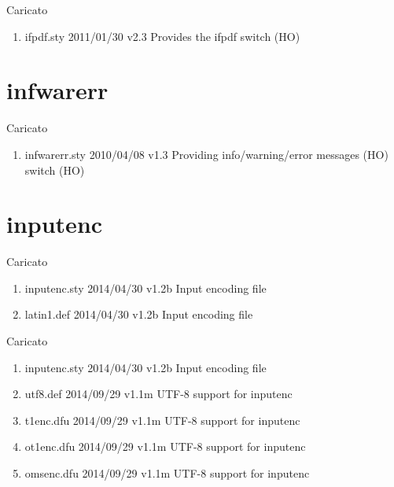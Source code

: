 Caricato 
\begin{enumerate}
\item ifpdf.sty 2011/01/30 v2.3 Provides the ifpdf switch (HO)
\end{enumerate} 
\section{infwarerr}  

Caricato 
\begin{enumerate}
\item infwarerr.sty 2010/04/08 v1.3 Providing info/warning/error messages (HO) switch (HO)
\end{enumerate} 
\section{inputenc}  

Caricato 
\begin{enumerate}
\item inputenc.sty 2014/04/30 v1.2b Input encoding file
\item latin1.def 2014/04/30 v1.2b Input encoding file 
\end{enumerate} 

Caricato 
\begin{enumerate}
\item inputenc.sty 2014/04/30 v1.2b Input encoding file
\item utf8.def 2014/09/29 v1.1m UTF-8 support for inputenc
\item t1enc.dfu 2014/09/29 v1.1m UTF-8 support for inputenc
\item ot1enc.dfu 2014/09/29 v1.1m UTF-8 support for inputenc
\item omsenc.dfu 2014/09/29 v1.1m UTF-8 support for inputenc
\end{enumerate}  

